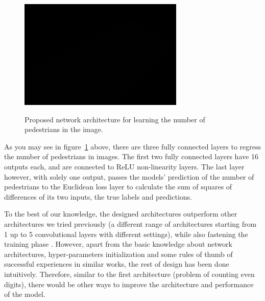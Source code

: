 \begin{figure}[H]
  \centering
   {\includegraphics[width=0.7\textwidth]{images/1}}
	\caption{Proposed network architecture for learning the number of pedestrians in the image.}
	\label{fig:ucsdnet}
\end{figure}

As you may see in figure~\ref{fig:ucsdnet} above, there are three fully connected layers to regress the number of pedestrians in images. The first two fully connected layers have 16 outputs each, and are connected to ReLU non-linearity layers. The last layer however, with solely one output, passes the models' prediction of the number of pedestrians to the Euclidean loss layer to calculate the sum of squares of differences of its two inputs, the true labels and predictions. 

To the best of our knowledge, the designed architectures outperform other architectures we tried previously (a different range of architectures starting from 1 up to 5 convolutional layers with different settings), while also fastening the training phase . However, apart from the basic knowledge about network architectures, hyper-parameters initialization and some rules of thumb of successful experiences in similar works, the rest of design has been done intuitively. Therefore, similar to the first architecture (problem of counting even digits), there would be other ways to improve the architecture and performance of the model.


